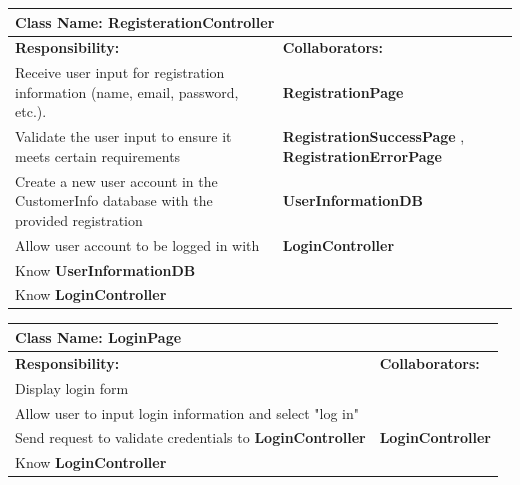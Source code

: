\documentclass[]{article}
\begin{document}
\begin{table}[H]
        \centering
        \begin{tabular}{|p{5cm}|p{5cm}|}
        \hline 
         \multicolumn{2}{|l|}{\textbf{Class Name:} RegisterationController} \\
        \hline
        \textbf{Responsibility:} & \textbf{Collaborators:} \\
        \hline
       Receive user input for registration information (name, email, password, etc.). &  \textbf{RegistrationPage} \\
        \hline
       Validate the user input to ensure it meets certain requirements & \textbf{RegistrationSuccessPage} , \textbf{RegistrationErrorPage} \\ 
        \hline
        Create a new user account in the CustomerInfo database with the provided registration & \textbf{UserInformationDB} \\ 
        \hline
        Allow user account to be logged in with &\textbf{LoginController}\\
        \hline
        Know \textbf{UserInformationDB} & \phantom{} \\
        \hline
        Know \textbf{LoginController} & \phantom{} \\
        \hline
        \end{tabular}
    \end{table}

   \begin{table}[H]
        \centering
        \begin{tabular}{|p{5cm}|p{5cm}|}
        \hline 
         \multicolumn{2}{|l|}{\textbf{Class Name:} LoginPage} \\
        \hline
        \textbf{Responsibility:} & \textbf{Collaborators:} \\
        \hline
        Display login form &  \phantom{} \\
        \hline
        Allow user to input login information and select "log in" & \phantom{} \\
        \hline
        Send request to validate credentials to \textbf{LoginController} & \textbf{LoginController} \\
        \hline
        Know \textbf{LoginController} & \phantom{} \\
        \hline
        \end{tabular}
    \end{table}
\end{document}
